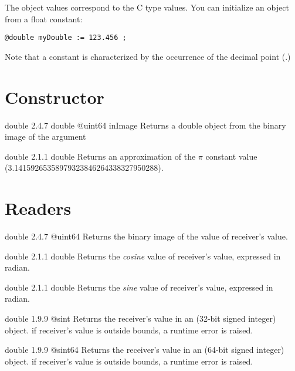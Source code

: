 

The  object values correspond to the C type  values. You can initialize an  object from a float constant:

\texttt{@double myDouble := 123.456 ;}

Note that a  constant is characterized by the occurrence of the decimal point (.)

\section{Constructor}

{double}
{2.4.7}
{double}
{@uint64 inImage}
{Returns a double object from the binary image of the argument}
{}

{double}
{2.1.1}
{double}
{Returns an approximation of the $\pi$ constant value (3.14159265358979323846264338327950288).}
{}

\section{Readers}

{double}
{2.4.7}
{@uint64}
{Returns the binary image of the value of receiver's value.}
{}




{double}
{2.1.1}
{double}
{Returns the \emph{cosine} value of receiver's value, expressed in radian.}
{}




{double}
{2.1.1}
{double}
{Returns the \emph{sine} value of receiver's value, expressed in radian.}
{}




{double}
{1.9.9}
{@sint}
{Returns the receiver's value in an  (32-bit signed integer) object.}
{if receiver's value is outside  bounds, a runtime error is raised.}



{double}
{1.9.9}
{@sint64}
{Returns the receiver's value in an  (64-bit signed integer) object.}
{if receiver's value is outside  bounds, a runtime error is raised.}




